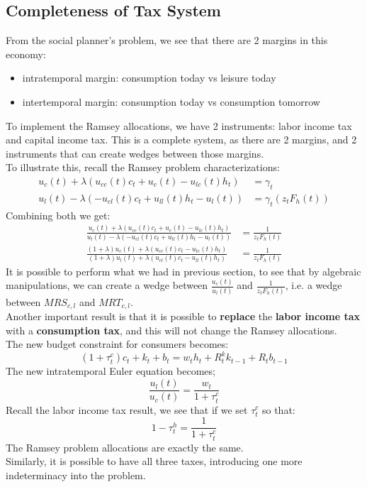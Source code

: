\documentclass[12pt]{article}
\begin{document}
	\subsection{Completeness of Tax System}
	From the social planner's problem, we see that there are 2 margins in this economy:
	\begin{itemize}
		\item intratemporal margin: consumption today vs leisure today
		\item intertemporal margin: consumption today vs consumption tomorrow
	\end{itemize}
	To implement the Ramsey allocations, we have 2 instruments: labor income tax and capital income tax. This is a complete system, as there are 2 margins, and 2 instruments that can create wedges between those margins.\\
	To illustrate this, recall the Ramsey problem characterizations:
	\begin{align*}
		u_c(t) + \lambda (u_{cc}(t)c_t + u_c(t) - u_{lc}(t)h_t) &= \gamma_t\\
		u_l(t) - \lambda(-u_{cl}(t)c_t +u_{ll}(t)h_t - u_l(t)) &=  \gamma_t (z_t F_h(t)) 
	\end{align*}
	Combining both we get:
	\begin{align*}
		\frac{u_c(t) + \lambda (u_{cc}(t)c_t + u_c(t) - u_{lc}(t)h_t)}{u_l(t) - \lambda(-u_{cl}(t)c_t +u_{ll}(t)h_t - u_l(t))} &= \frac{1}{z_t F_h(t)}\\
		\frac{(1 + \lambda)u_c(t) + \lambda (u_{cc}(t)c_t - u_{lc}(t)h_t)}{(1 + \lambda)u_l(t) + \lambda(u_{cl}(t)c_t - u_{ll}(t)h_t)} &= \frac{1}{z_t F_h(t)}
	\end{align*}
	It is possible to perform what we had in previous section, to see that by algebraic manipulations, we can create a wedge between $\frac{u_c(t)}{u_l(t)}$ and $\frac{1}{z_tF_h(t)}$, i.e. a wedge between $MRS_{c,l}$ and $MRT_{c,l}$.\\
	
	\noindent
	Another important result is that it is possible to \textbf{replace} the \textbf{labor income tax} with a \textbf{consumption tax}, and this will not change the Ramsey allocations.\\
	The new budget constraint for consumers becomes:
	\begin{equation*}
		(1 + \tau_t^c) c_t + k_t + b_t = w_t h_t + R_t^k k_{t-1} + R_t b_{t-1}
	\end{equation*}
	The new intratemporal Euler equation becomes;
	\begin{equation*}
		\frac{u_l(t)}{u_c(t)} = \frac{w_t}{1 + \tau_t^c}
	\end{equation*}
	Recall the labor income tax result, we see that if we set $\tau_t^c$ so that:
	\begin{equation*}
		1-\tau_t^h = \frac{1}{1+\tau_t^c}
	\end{equation*}
	The Ramsey problem allocations are exactly the same.\\
		Similarly, it is possible to have all three taxes, introducing one more indeterminacy into the problem.
	
\end{document}
